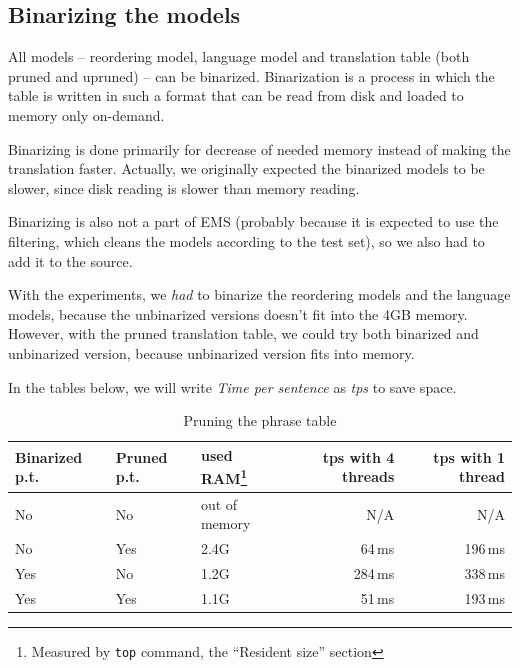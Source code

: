 \subsection{Binarizing the models}
All models -- reordering model, language model and translation table (both pruned and upruned) -- can be binarized. Binarization is a process in which the table is written in such a format that can be read from disk and loaded to memory only on-demand.

Binarizing is done primarily for decrease of needed memory instead of making the translation faster. Actually, we originally expected the binarized models to be slower, since disk reading is slower than memory reading.

Binarizing is also not a part of EMS (probably because it is expected to use the filtering, which cleans the models according to the test set), so we also had to add it to the source.

With the experiments, we \emph{had} to binarize the reordering models and the language models, because the unbinarized versions doesn't fit into the 4GB memory. However, with the pruned translation table, we could try both binarized and unbinarized version, because unbinarized version fits into memory.

In the tables below, we will write \emph{Time per sentence} as \emph{tps} to save space.

\begin{table}[h]
\begin{center}
\begin{tabular}{|l|l|l|r|r|}
    \hline
    \textbf{Binarized p.t.} & \textbf{Pruned p.t.} & \textbf{used RAM}\footnote{Measured by \texttt{top} command, the ``Resident size'' section} & \textbf{tps with 4 threads} & \textbf{tps with 1 thread} \\ \hline
    No & No & out of memory & N/A&N/A \\ \hline
    No & Yes & 2.4G & 64\,ms& 196\,ms\\ \hline
    Yes & No & 1.2G & 284\,ms& 338\,ms\\ \hline
   
    Yes & Yes & 1.1G & 51\,ms& 193\,ms\\ \hline
    
\end{tabular}
\end{center}

\caption{Pruning the phrase table}\label{moses:binarizing}
\end{table}

